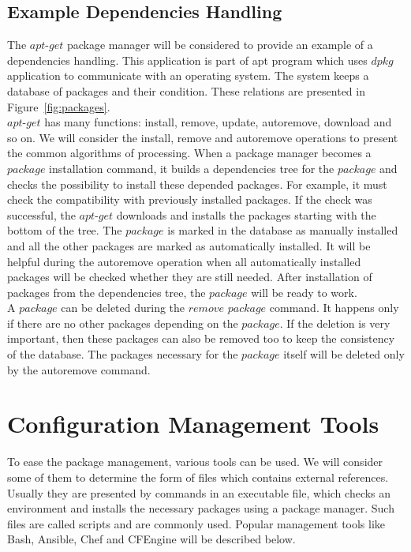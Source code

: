 \subsection*{Example Dependencies Handling}
The $apt$-$get$ package manager will be considered to provide an example of a dependencies handling.
This application is part of \gls{apt} program which uses $dpkg$ application to communicate with an operating system.
The system keeps a database of packages and their condition.
These relations are presented in Figure~\ref{fig:packages}.\\
$apt$-$get$ has many functions: install, remove, update, autoremove, download and so on.
We will consider the install, remove and autoremove operations to present the common algorithms of processing.
When a package manager becomes a $package$ installation command, it builds a dependencies tree for the $package$ and checks the possibility to install these depended packages.
For example, it must check the compatibility with previously installed packages. 
If the check was successful, the $apt$-$get$ downloads and installs the packages starting with the bottom of the tree.
The $package$ is marked in the database as manually installed and all the other packages are marked as automatically installed. 
It will be helpful during the autoremove operation when all automatically installed packages will be checked whether they are still needed.
After installation of packages from the dependencies tree, the $package$ will be ready to work.\\
A $package$ can be deleted during the $remove$ $package$ command.
It happens only if there are no other packages depending on the $package$. 
If the deletion is very important, then these packages can also be removed too to keep the consistency of the database. 
The packages necessary for the $package$ itself will be deleted only by the autoremove command.

\section{Configuration Management Tools}
To ease the package management, various tools can be used. 
We will consider some of them to determine the form of files which contains external references.
Usually they are presented by commands in an executable file, which checks an environment and installs the necessary packages using a package manager.
Such files are called scripts and are commonly used.
Popular management tools like Bash, Ansible, Chef and CFEngine will be described below.
